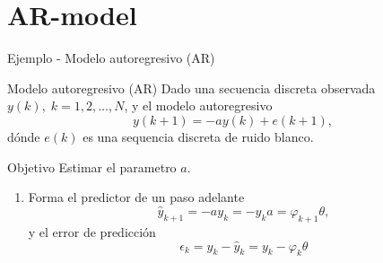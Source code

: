 \documentclass[presentation,aspectratio=169]{beamer}
\begin{document}
\section{AR-model}
\label{sec:orga00114e}

\begin{frame}[label={sec:org3a7ba52}]{Ejemplo - Modelo autoregresivo (AR)}
\end{frame}
\begin{frame}[label={sec:orga436dbc}]{Modelo autoregresivo (AR)}
Dado una secuencia discreta observada \(y(k), \; k=1,2,\ldots,N\), y el modelo autoregresivo
\[ y(k+1) = -ay(k) + e(k+1),\]
dónde \(e(k)\) es una sequencia discreta de ruido blanco.

\alert{Objetivo} Estimar el parametro \(a\).

\begin{enumerate}
\item Forma el predictor de un paso adelante \[\hat{y}_{k+1} = -ay_k=-y_ka = \varphi_{k+1} \theta,\] y el error de predicción \[\epsilon_k = y_k - \hat{y}_k = y_k - \varphi_k \theta\]
\end{enumerate}
\end{frame}
\end{document}
